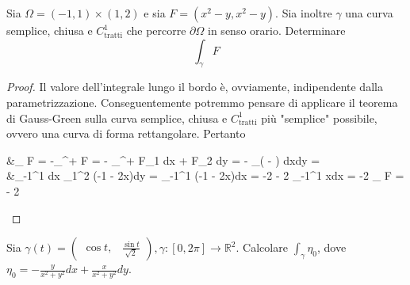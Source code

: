\begin{example}
	Sia $\Omega = (-1, 1) \times (1, 2)$ e sia $F=(x^2 - y, x^2 - y)$. Sia inoltre $\gamma$ una curva semplice, chiusa e $C^1_\text{tratti}$ che percorre $\partial \Omega$ in senso orario. Determinare
	$$
	\int_\gamma F
	$$
\end{example}
\begin{proof}
	Il valore dell'integrale lungo il bordo è, ovviamente, indipendente dalla parametrizzazione. Conseguentemente potremmo pensare di applicare il teorema di Gauss-Green sulla curva semplice, chiusa e $C^1_\text{tratti}$ più "semplice" possibile, ovvero una curva di forma rettangolare.
	Pertanto
	\begin{flalign*}
	&\int_{\gamma} F = -\int_{\partial^{+} \Omega} F = - \int_{\partial^{+} \Omega} F_1 dx + F_2 dy = - \int_\Omega \left(  -  \right) dxdy = \\ 
	&\int_{-1}^{1} dx \int_1^2 (-1 - 2x)dy = \int_{-1}^{1} (-1 - 2x)dx = -2 - 2 \int_{-1}^1 xdx = -2 \implies \int_{\gamma} F = - 2
	\end{flalign*}
\end{proof}
\begin{example}
	Sia $\gamma(t) = \begin{pmatrix} \cos{t}, & \frac{\sin{t}}{\sqrt{2}} \end{pmatrix}, \gamma: [0, 2\pi] \to \mathbb{R}^2$. Calcolare $\int_\gamma \eta_0$, dove $\eta_0 = - \frac{y}{x^2 + y^2}dx + \frac{x}{x^2 + y^2}dy$.
\end{example}
